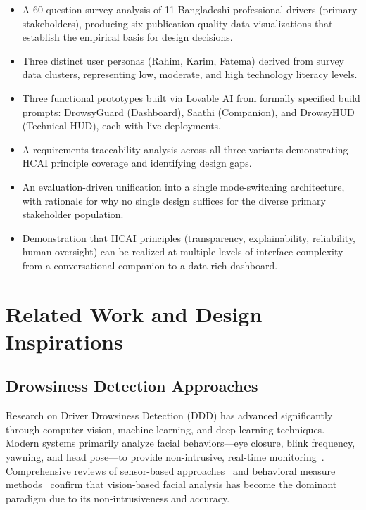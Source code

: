 \documentclass[sigconf]{acmart}
\begin{document}
\begin{itemize}
    \item A 60-question survey analysis of 11 Bangladeshi professional drivers (primary stakeholders), producing six publication-quality data visualizations that establish the empirical basis for design decisions.
    \item Three distinct user personas (Rahim, Karim, Fatema) derived from survey data clusters, representing low, moderate, and high technology literacy levels.
    \item Three functional prototypes built via Lovable AI from formally specified build prompts: DrowsyGuard (Dashboard), Saathi (Companion), and DrowsyHUD (Technical HUD), each with live deployments.
    \item A requirements traceability analysis across all three variants demonstrating HCAI principle coverage and identifying design gaps.
    \item An evaluation-driven unification into a single mode-switching architecture, with rationale for why no single design suffices for the diverse primary stakeholder population.
    \item Demonstration that HCAI principles (transparency, explainability, reliability, human oversight) can be realized at multiple levels of interface complexity---from a conversational companion to a data-rich dashboard.
\end{itemize}

\section{Related Work and Design Inspirations}

\subsection{Drowsiness Detection Approaches}

Research on Driver Drowsiness Detection (DDD) has advanced significantly through computer vision, machine learning, and deep learning techniques. Modern systems primarily analyze facial behaviors---eye closure, blink frequency, yawning, and head pose---to provide non-intrusive, real-time monitoring~\cite{ref3, ref6}. Comprehensive reviews of sensor-based approaches~\cite{ref24} and behavioral measure methods~\cite{ref28} confirm that vision-based facial analysis has become the dominant paradigm due to its non-intrusiveness and accuracy.
\end{document}
